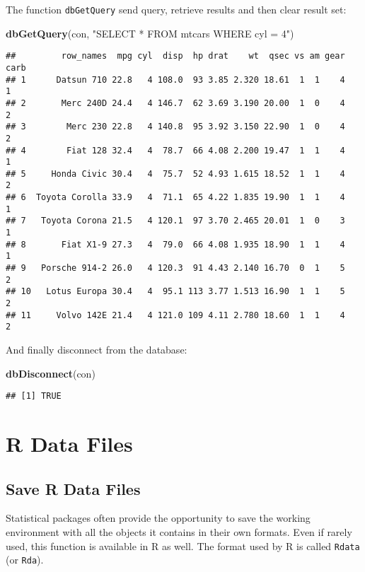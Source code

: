 \documentclass[]{book}
\newenvironment{Shaded}{\begin{snugshade}}{\end{snugshade}}
\newcommand{\KeywordTok}[1]{\textcolor[rgb]{0.13,0.29,0.53}{\textbf{{#1}}}}
\newcommand{\StringTok}[1]{\textcolor[rgb]{0.31,0.60,0.02}{{#1}}}
\newcommand{\NormalTok}[1]{{#1}}
\begin{document}
The function \texttt{dbGetQuery} send query, retrieve results and then
clear result set:

\begin{Shaded}
\begin{Highlighting}[]
\KeywordTok{dbGetQuery}\NormalTok{(con, }\StringTok{"SELECT * FROM mtcars WHERE cyl = 4"}\NormalTok{)}
\end{Highlighting}
\end{Shaded}

\begin{verbatim}
##         row_names  mpg cyl  disp  hp drat    wt  qsec vs am gear carb
## 1      Datsun 710 22.8   4 108.0  93 3.85 2.320 18.61  1  1    4    1
## 2       Merc 240D 24.4   4 146.7  62 3.69 3.190 20.00  1  0    4    2
## 3        Merc 230 22.8   4 140.8  95 3.92 3.150 22.90  1  0    4    2
## 4        Fiat 128 32.4   4  78.7  66 4.08 2.200 19.47  1  1    4    1
## 5     Honda Civic 30.4   4  75.7  52 4.93 1.615 18.52  1  1    4    2
## 6  Toyota Corolla 33.9   4  71.1  65 4.22 1.835 19.90  1  1    4    1
## 7   Toyota Corona 21.5   4 120.1  97 3.70 2.465 20.01  1  0    3    1
## 8       Fiat X1-9 27.3   4  79.0  66 4.08 1.935 18.90  1  1    4    1
## 9   Porsche 914-2 26.0   4 120.3  91 4.43 2.140 16.70  0  1    5    2
## 10   Lotus Europa 30.4   4  95.1 113 3.77 1.513 16.90  1  1    5    2
## 11     Volvo 142E 21.4   4 121.0 109 4.11 2.780 18.60  1  1    4    2
\end{verbatim}

And finally disconnect from the database:

\begin{Shaded}
\begin{Highlighting}[]
\KeywordTok{dbDisconnect}\NormalTok{(con)}
\end{Highlighting}
\end{Shaded}

\begin{verbatim}
## [1] TRUE
\end{verbatim}

\section{R Data Files}\label{r-data-files}

\subsection{Save R Data Files}\label{save-r-data-files}

Statistical packages often provide the opportunity to save the working
environment with all the objects it contains in their own formats. Even
if rarely used, this function is available in R as well. The format used
by R is called \texttt{Rdata} (or \texttt{Rda}).
\end{document}
